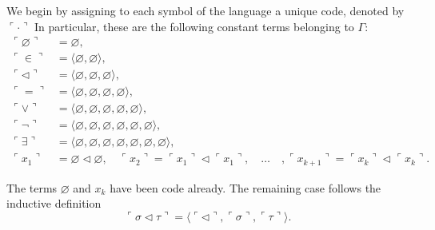 \begin{definition}
    \label{def:Code.Symbols}
    \leanok
    We begin by assigning to each symbol of the language a unique code, denoted by
    $\ulcorner \cdot\urcorner$
    In particular, these are the following constant terms belonging to $\Gamma$:
    $$
    \begin{aligned}
    \ulcorner{\varnothing}\urcorner & =\varnothing, \\
    \ulcorner{\in}\urcorner & =\langle \varnothing,\varnothing\rangle, \\
    \ulcorner{\lhd}\urcorner & =\langle \varnothing,\varnothing,\varnothing\rangle, \\
    \ulcorner{=}\urcorner & =\langle \varnothing,\varnothing,\varnothing,\varnothing\rangle, \\
    \ulcorner{\lor}\urcorner & =
    \langle \varnothing,\varnothing,\varnothing,\varnothing,\varnothing\rangle, \\
    \ulcorner{\neg}\urcorner & =
    \langle \varnothing,\varnothing,\varnothing,\varnothing,\varnothing,\varnothing\rangle, \\
    \ulcorner{\exists}\urcorner & =
    \langle \varnothing,\varnothing,\varnothing,\varnothing,\varnothing,\varnothing,
    \varnothing\rangle,\\
    \ulcorner{x_1}\urcorner & = \varnothing \lhd \varnothing, \quad 
    \ulcorner{x_2}\urcorner = \ulcorner{x_1}\urcorner \lhd \ulcorner{x_1}\urcorner,\quad\ldots\quad,
    \ulcorner{x_{k+1}}\urcorner = \ulcorner{x_k}\urcorner \lhd \ulcorner{x_k}\urcorner.
    \end{aligned}
    $$
\end{definition}

\begin{definition}
    \label{def:Code.Term}
    The terms $\varnothing$ and $x_k$ have been code already. 
    The remaining case follows the inductive definition
    $$
    \ulcorner{\sigma \lhd \tau}\urcorner = 
    \langle\ulcorner{\lhd}\urcorner, \ulcorner{\sigma}\urcorner, \ulcorner{\tau}\urcorner \rangle.
    $$
\end{definition}

